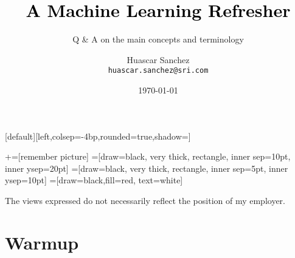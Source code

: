 

\usepackage{framed}
\usepackage[inline]{enumitem}
\usepackage[backend=bibtex]{biblatex}
\usepackage{amssymb}

\newcommand{\norm}[1]{\left\lVert #1 \right\rVert}

\title[]{\Huge \textbf{\textcolor{black}{A Machine Learning Refresher}}}
\subtitle{\Large Q \& A on the main concepts and terminology}
\author[HAS]{
\parbox[t]{1.5in}{Huascar Sanchez \\\small\texttt{huascar.sanchez@sri.com}} %
}

\date{\today}

\makeatletter
{}[default][left,colsep=-4bp,rounded=true,shadow=\beamer@themerounded@shadow]
\makeatother


\newcommand\marktopleft[1]{%
    \tikz[overlay,remember picture]
        \node (marker-#1-a) at (-.3em,.3em) {};%
}
\newcommand\markbottomright[2]{%
    \tikz[overlay,remember picture]
        \node (marker-#1-b) at (0em,0em) {};%
}
+=[remember picture]
 =[draw=black, very thick, rectangle, inner sep=10pt, inner ysep=20pt]
 =[draw=black, very thick, rectangle, inner sep=5pt, inner ysep=10pt]
 =[draw=black,fill=red, text=white]

\begin{frame}
\maketitle
\tiny\hspace{1em}The views expressed do not necessarily reflect the position of my employer.
\end{frame}

\section{Warmup}

